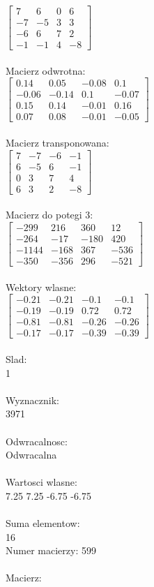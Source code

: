 \documentclass[a4paper,12pt]{article}
\begin{document}
$\begin{bmatrix} 7&6&0&6\\-7&-5&3&3\\-6&6&7&2\\-1&-1&4&-8 \end{bmatrix}$
\\
\\
Macierz odwrotna:\\

$\begin{bmatrix} 0.14&0.05&-0.08&0.1\\-0.06&-0.14&0.1&-0.07\\0.15&0.14&-0.01&0.16\\0.07&0.08&-0.01&-0.05 \end{bmatrix}$
\\
\\
Macierz transponowana:\\

$\begin{bmatrix} 7&-7&-6&-1\\6&-5&6&-1\\0&3&7&4\\6&3&2&-8 \end{bmatrix}$
\\
\\
Macierz do potegi 3:\\

$\begin{bmatrix} -299&216&360&12\\-264&-17&-180&420\\-1144&-168&367&-536\\-350&-356&296&-521 \end{bmatrix}$
\\
\\
Wektory wlasne:\\

$\begin{bmatrix} -0.21&-0.21&-0.1&-0.1\\-0.19&-0.19&0.72&0.72\\-0.81&-0.81&-0.26&-0.26\\-0.17&-0.17&-0.39&-0.39 \end{bmatrix}$
\\
\\
Slad:\\
1
\\
\\
Wyznacznik:\\
3971
\\
\\
Odwracalnosc:\\
Odwracalna
\\
\\
Wartosci wlasne:\\
7.25 7.25 -6.75 -6.75
\\
\\
Suma elementow:\\
16
\\
\newpage
Numer macierzy:
599
\\
\\
Macierz:\\
\end{document}
